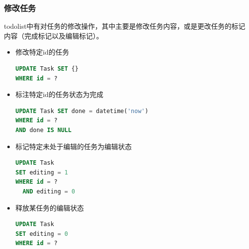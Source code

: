 \documentclass[a4paper, 11pt]{article}
\begin{document}
\subsubsection{修改任务}
\par todolist中有对任务的修改操作，其中主要是修改任务内容，或是更改任务的标记内容（完成标记以及编辑标记）。
\begin{itemize}
\item 修改特定id的任务
\begin{lstlisting}[language=SQL]
UPDATE Task SET {}
WHERE id = ?
\end{lstlisting}
\item 标注特定id的任务状态为完成
\begin{lstlisting}[language=SQL]
UPDATE Task SET done = datetime('now')
WHERE id = ?
AND done IS NULL
\end{lstlisting}
\item 标记特定未处于编辑的任务为编辑状态
\begin{lstlisting}[language=SQL]
UPDATE Task
SET editing = 1
WHERE id = ?
  AND editing = 0
\end{lstlisting}
\item 释放某任务的编辑状态
\begin{lstlisting}[language=SQL]
UPDATE Task
SET editing = 0
WHERE id = ?
\end{lstlisting}
\end{itemize}
\end{document}
